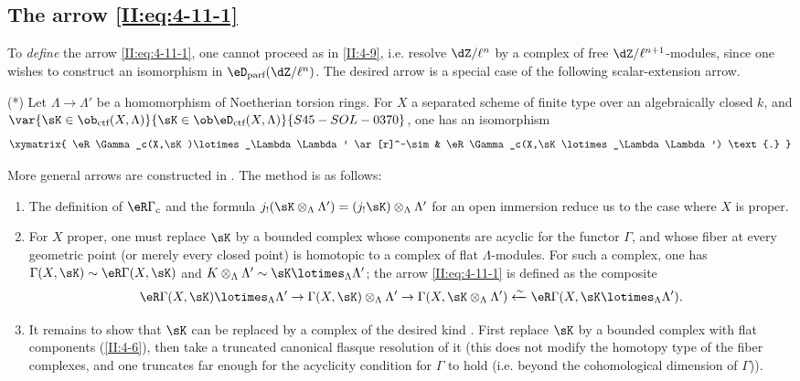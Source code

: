 \subsection{The arrow \texorpdfstring{\eqref{II:eq:4-11-1}}{(4.11.1)}}\label{II:4-12}

To \emph{define} the arrow \eqref{II:eq:4-11-1}, one cannot proceed as in
\ref{II:4-9}, i.e. resolve $\dZ/\ell^n$ by a complex of free
$\dZ/\ell^{n+1}$-modules, since one wishes to construct an isomorphism in
$\eD_\text{parf}(\dZ/\ell^n)$. The desired arrow is a special case of the
following scalar-extension arrow.

(*) Let $\Lambda\to\Lambda'$ be a homomorphism of Noetherian torsion rings.
For $X$ a separated scheme of finite type over an algebraically closed $k$,
and $\var{\sK\in\ob_{\text{ctf}}(X,\Lambda)}{\sK\in\ob\eD_\text{ctf}(X,\Lambda)}{S45-SOL-0370}$, one has an isomorphism
\[\xymatrix{
  \eR\Gamma_c(X,\sK)\lotimes_\Lambda \Lambda' \ar[r]^-\sim & \eR \Gamma_c(X,\sK\lotimes_\Lambda \Lambda') \text{.}
}\]

More general arrows are constructed in \cite[XVII 4.2.12]{sga4}. The method
is as follows:
\begin{enumerate}[\indent a)]
  \item {}The definition of $\eR\Gamma_c$ and the formula
    $j_!(\sK\otimes_\Lambda\Lambda') = (j_! \sK)\otimes_\Lambda\Lambda'$ for
    an open immersion reduce us to the case where $X$ is proper.
  \item For $X$ proper, one must replace $\sK$ by a bounded complex whose
    components are acyclic for the functor $\Gamma$, and whose fiber at every
    geometric point (or merely every closed point) is homotopic to a complex
    of flat $\Lambda$-modules. For such a complex, one has
    $\Gamma(X,\sK)\sim \eR\Gamma(X,\sK)$ and
    $K\otimes_\Lambda\Lambda'\sim \sK\lotimes_\Lambda\Lambda'$; the arrow
    \eqref{II:eq:4-11-1} is defined as the composite
    \[
      \eR\Gamma(X,\sK)\lotimes_\Lambda \Lambda' \to \Gamma(X,\sK)\otimes_\Lambda\Lambda' \to \Gamma(X,\sK\otimes_\Lambda\Lambda') \xleftarrow\sim \eR\Gamma(X,\sK\lotimes_\Lambda\Lambda') \text{.}
    \]
  \item It remains to show that $\sK$ can be replaced by a complex of the
    desired kind \cite[XVII.4.2.10]{sga4}. First replace $\sK$ by a bounded
    complex with flat components (\ref{II:4-6}), then take a truncated
    canonical flasque resolution of it (this does not modify the homotopy
    type of the fiber complexes, and one truncates far enough for the
    acyclicity condition for $\Gamma$ to hold (i.e. beyond the cohomological
    dimension of $\Gamma$)).
\end{enumerate}






